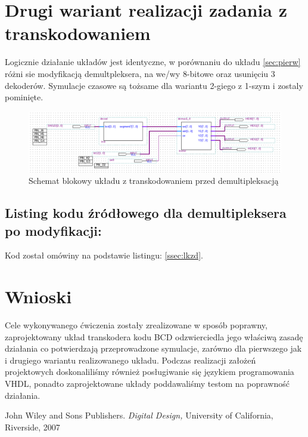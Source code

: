 \documentclass{classrep}
\begin{document}
\section{Drugi wariant realizacji zadania z transkodowaniem}
Logicznie działanie układów jest identyczne, w porównaniu do układu \ref{sec:pierw} różni sie modyfikacją demultpleksera, na we/wy 8-bitowe oraz usunięciu 3 dekoderów. Symulacje czasowe są tożsame dla wariantu 2-giego z 1-szym i zostaly pominięte.
\begin{figure}[H]
\centering
\includegraphics[width=1.0\linewidth]{block_segment_bcd}
\caption{Schemat blokowy układu z transkodowaniem przed demultipleksacją}
\label{fig:block_segment_bcd}
\end{figure}

\subsection{Listing kodu źródłowego dla demultipleksera po modyfikacji:}
Kod został omówiny na podstawie listingu: \ref{ssec:lkzd}.



\section{Wnioski}
Cele wykonywanego ćwiczenia zostały zrealizowane w sposób poprawny, zaprojektowany układ transkodera kodu BCD odzwierciedla jego właściwą zasadę działania co potwierdzają przeprowadzone symulacje, zarówno dla pierwszego jak i drugiego wariantu realizowanego układu. Podczas realizacji założeń projektowych doskonaliliśmy również posługiwanie się językiem programowania VHDL, ponadto zaprojektowane układy poddawaliśmy testom na poprawność działania.

\begin{thebibliography}{0}
   John Wiley and Sons Publishers.
    \textsl{Digital Design,} University of California, Riverside, 2007
\end{thebibliography}
\end{document}
